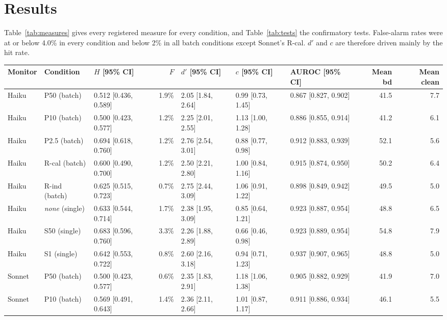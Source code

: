 \documentclass[letterpaper]{article} %
\begin{document}
\section{Results}

Table~\ref{tab:measures} gives every registered measure for every condition, and Table~\ref{tab:tests} the confirmatory tests. False-alarm rates were at or below 4.0\% in every condition and below 2\% in all batch conditions except Sonnet's R-cal. $d'$ and $c$ are therefore driven mainly by the hit rate.

\begin{table}[t]
\centering
\small
\setlength{\tabcolsep}{4pt}
\begin{tabular}{@{}l l l r l l l r r@{}}
\toprule
Monitor & Condition & $H$ [95\% CI] & $F$ & $d'$ [95\% CI] & $c$ [95\% CI] & AUROC [95\% CI] & Mean bd & Mean clean \\
\midrule
Haiku & P50 (batch) & 0.512 [0.436, 0.589] & 1.9\% & 2.05 [1.84, 2.64] & 0.99 [0.73, 1.45] & 0.867 [0.827, 0.902] & 41.5 & 7.7 \\
Haiku & P10 (batch) & 0.500 [0.423, 0.577] & 1.2\% & 2.25 [2.01, 2.55] & 1.13 [1.00, 1.28] & 0.886 [0.855, 0.914] & 41.2 & 6.1 \\
Haiku & P2.5 (batch) & 0.694 [0.618, 0.760] & 1.2\% & 2.76 [2.54, 3.01] & 0.88 [0.77, 0.98] & 0.912 [0.883, 0.939] & 52.1 & 5.6 \\
Haiku & R-cal (batch) & 0.600 [0.490, 0.700] & 1.2\% & 2.50 [2.21, 2.80] & 1.00 [0.84, 1.16] & 0.915 [0.874, 0.950] & 50.2 & 6.4 \\
Haiku & R-ind (batch) & 0.625 [0.515, 0.723] & 0.7\% & 2.75 [2.44, 3.09] & 1.06 [0.91, 1.22] & 0.898 [0.849, 0.942] & 49.5 & 5.0 \\
Haiku & \emph{none} (single) & 0.633 [0.544, 0.714] & 1.7\% & 2.38 [1.95, 3.09] & 0.85 [0.64, 1.21] & 0.923 [0.887, 0.954] & 48.8 & 6.5 \\
Haiku & S50 (single) & 0.683 [0.596, 0.760] & 3.3\% & 2.26 [1.88, 2.89] & 0.66 [0.46, 0.98] & 0.923 [0.889, 0.954] & 54.8 & 7.9 \\
Haiku & S1 (single) & 0.642 [0.553, 0.722] & 0.8\% & 2.60 [2.16, 3.18] & 0.94 [0.71, 1.23] & 0.937 [0.907, 0.965] & 48.8 & 5.0 \\
\midrule
Sonnet & P50 (batch) & 0.500 [0.423, 0.577] & 0.6\% & 2.35 [1.83, 2.91] & 1.18 [1.06, 1.38] & 0.905 [0.882, 0.929] & 41.9 & 7.0 \\
Sonnet & P10 (batch) & 0.569 [0.491, 0.643] & 1.4\% & 2.36 [2.11, 2.66] & 1.01 [0.87, 1.17] & 0.911 [0.886, 0.934] & 46.1 & 5.5 \\

\end{tabular}
\end{table}
\end{document}
